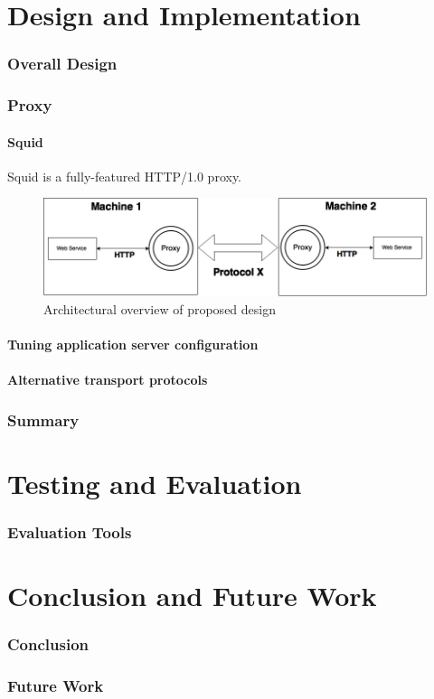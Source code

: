 \documentclass[USenglish]{article}
\begin{document}
\part{Design and Implementation}
\section{Overall Design}
\section{Proxy}
\subsection{Squid}
Squid is a fully-featured HTTP/1.0 proxy.
\begin{figure}[h]
\includegraphics[scale=0.4]{images/architecture.png}
\caption{Architectural overview of proposed design}
\end{figure}



\subsection{Tuning application server configuration}

\subsection{Alternative transport protocols}

\section{Summary}

\part{Testing and Evaluation}
\section{Evaluation Tools}

\part{Conclusion and Future Work}
\section{Conclusion}

\section{Future Work}

\pagebreak
\printbibliography{}
\printglossary
\end{document}
